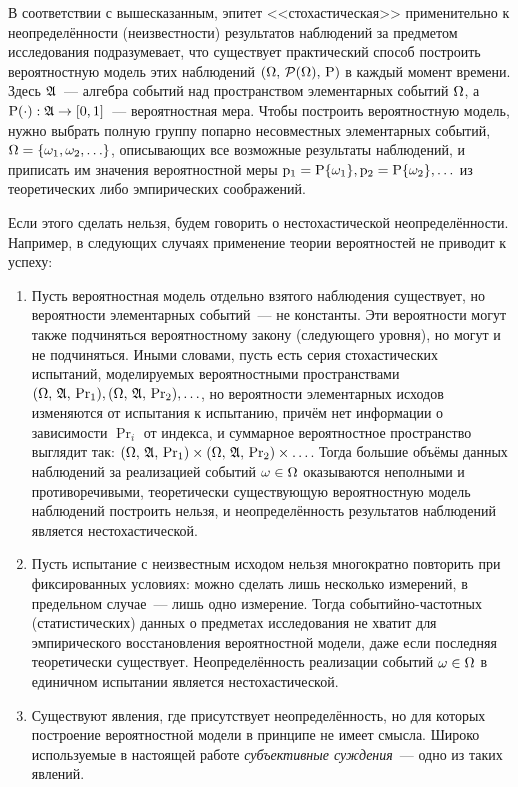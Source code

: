 В соответствии с вышесказанным, эпитет <<стохастическая>> применительно к  неопределённости (неизвестности) результатов наблюдений за предметом исследования подразумевает, что существует практический способ построить вероятностную модель этих наблюдений %
${(\Omega,\,\mathcal{P}(\Omega),\,{\mathrm{P}})}$ в каждый момент времени. Здесь ${\mathfrak{A}}$~--- алгебра событий над пространством элементарных событий $\Omega$, а ${\mathrm{P}}(\cdot): {\mathfrak{A}} \to [0,1]$~--- вероятностная мера. Чтобы построить вероятностную модель, нужно выбрать полную группу попарно несовместных элементарных событий, $\Omega = \{\omega_1, \omega_2, \ldots\}$, описывающих все возможные результаты наблюдений, и приписать им значения вероятностной меры ${\mathrm{p}}_1 = {\mathrm{P}}\{\omega_1\}, {\mathrm{p}}_2 = {\mathrm{P}}\{\omega_2\}, \ldots$ из теоретических либо эмпирических соображений. 

Если этого сделать нельзя, будем говорить о нестохастической неопределённости. Например, в следующих случаях применение теории вероятностей не приводит к успеху:
\begin{enumerate}
  \item Пусть вероятностная модель отдельно взятого наблюдения существует, но вероятности элементарных событий~--- не константы. Эти вероятности могут также подчиняться вероятностному закону (следующего уровня), но могут и не подчиняться. Иными словами, пусть есть серия стохастических испытаний, моделируемых вероятностными пространствами ${(\Omega,\, {\mathfrak{A}},\,{\mathrm{Pr}}_{1})}, {(\Omega,\, {\mathfrak{A}},\,{\mathrm{Pr}}_{2})}, \ldots$, но вероятности элементарных исходов изменяются от испытания к испытанию, причём нет информации о зависимости $\Pr_{i}$ от индекса, и суммарное вероятностное пространство выглядит так: ${(\Omega,\, {\mathfrak{A}},\,{\mathrm{Pr}}_{1})} \times {(\Omega,\, {\mathfrak{A}},\,{\mathrm{Pr}}_{2})} \times \ldots$. Тогда большие объёмы данных наблюдений за реализацией событий $\omega \in \Omega$ оказываются неполными и противоречивыми, теоретически существующую вероятностную модель наблюдений построить нельзя, и неопределённость результатов наблюдений является нестохастической. 
  \item Пусть испытание с неизвестным исходом нельзя многократно повторить при фиксированных условиях: можно сделать лишь несколько измерений, в предельном случае~--- лишь одно измерение. Тогда событийно-частотных (статистических) данных о предметах исследования не хватит для эмпирического восстановления вероятностной модели, даже если последняя теоретически существует. Неопределённость реализации событий $\omega \in \Omega$ в единичном испытании является нестохастической. 
  \item {}Существуют явления, где присутствует неопределённость, но для которых построение вероятностной модели в принципе не имеет смысла. Широко используемые в настоящей работе {\sl субъективные суждения}~--- одно из таких явлений. 
\end{enumerate} 


